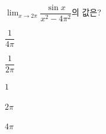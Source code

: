 $\displaystyle\lim_{x\to 2\pi}\dfrac{\sin x}{x^2-4\pi^2}$의 값은?
\begin{choices32}{\rule[-3ex]{0pt}{8ex}$\dfrac{1}{4\pi}$}{\rule[-3ex]{0pt}{8ex}$\dfrac{1}{2\pi}$}{\rule[-3ex]{0pt}{8ex}$1$}{\rule[-3ex]{0pt}{8ex}$2\pi$}{\rule[-3ex]{0pt}{8ex}$4\pi$}\end{choices32}
